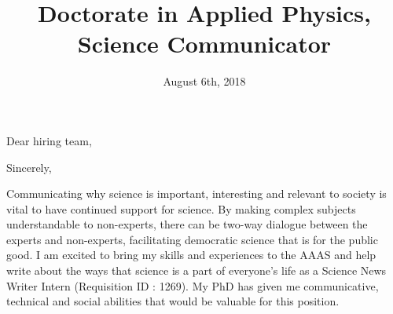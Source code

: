 \documentclass[10pt,letter,sans,final,colorlinks,linkcolor=blue]{moderncv}        %
\title{Doctorate in Applied Physics, Science Communicator}
\begin{document}
\hypersetup{urlcolor=links}
\vspace{-10cm}
\makecvtitle
\vspace{-1.3cm}









%
%
%
%
%
%
%
%
%

%


\clearpage

\date{August 6th, 2018}
\opening{Dear hiring team,}
\closing{Sincerely,}
\makelettertitle

Communicating why science is important, interesting and relevant to society is vital to have continued support for science. By making complex subjects understandable to non-experts, there can be two-way dialogue between the experts and non-experts, facilitating democratic science that is for the public good. I am excited to bring my skills and experiences to the AAAS and help write about the ways that science is a part of everyone’s life as a Science News Writer Intern (Requisition ID : 1269). My PhD has given me communicative, technical and social abilities that would be valuable for this position.
\end{document}
